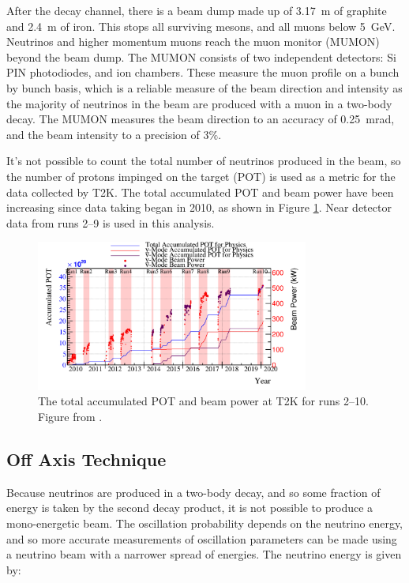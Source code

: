 After the decay channel, there is a beam dump made up of 3.17~m of graphite and 2.4~m of iron. This stops all surviving mesons, and all muons below 5~GeV. Neutrinos and higher momentum muons reach the muon monitor (MUMON) beyond the beam dump. The MUMON consists of two independent detectors: Si PIN photodiodes, and ion chambers. These measure the muon profile on a bunch by bunch basis, which is a reliable measure of the beam direction and intensity as the majority of neutrinos in the beam are produced with a muon in a two-body decay. The MUMON measures the beam direction to an accuracy of 0.25~mrad, and the beam intensity to a precision of 3$\%$\cite{mumon}.

It's not possible to count the total number of neutrinos produced in the beam, so the number of protons impinged on the target (POT) is used as a metric for the data collected by T2K. The total accumulated POT and beam power have been increasing since data taking began in 2010, as shown in Figure \ref{fig:pot}. Near detector data from runs 2--9 is used in this analysis.

\begin{figure}
\centering
\includegraphics*[width=0.8\textwidth,clip]{figs/pow_t2k_all_toRun84}
\caption{The total accumulated POT and beam power at T2K for runs 2--10. Figure from \cite{yasutome_2020}.} \label{fig:pot}
\end{figure}

\subsection{Off Axis Technique}

Because neutrinos are produced in a two-body decay, and so some fraction of energy is taken by the second decay product, it is not possible to produce a mono-energetic beam. The oscillation probability depends on the neutrino energy, and so more accurate measurements of oscillation parameters can be made using a neutrino beam with a narrower spread of energies. The neutrino energy is given by\cite{Enuoffaxis}:

